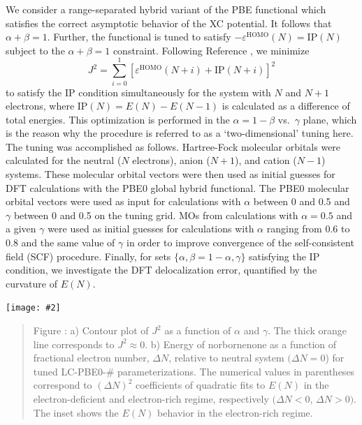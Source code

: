 \documentclass[landscape,a0b,final]{a0poster}
\newenvironment{poster}{
  \begin{center}
  \begin{minipage}[c]{0.98\textwidth}
}{
  \end{minipage} 
  \end{center}
}
\newcommand{\myfig}[3][0]{
\begin{center}
  \vspace{1.5cm}
  \texttt{[image: \#2]}
  \nobreak\medskip
\end{center}}
\newcommand{\mycaption}[1]{
  \vspace{0.5cm}
  \begin{quote}
    {{\sc Figure} \arabic{figure}: #1}
  \end{quote}
  \vspace{1cm}
  \stepcounter{figure}
}
\begin{document}
\begin{poster}
\begin{multicols}{3}
    We consider a range-separated hybrid variant of the PBE functional
    which satisfies the correct asymptotic behavior of the XC
    potential. It follows that $\alpha + \beta = 1$. Further, the
    functional is tuned to satisfy
    $-{\varepsilon}^{\text{HOMO}}(N)=\text{IP}(N)$ subject to the $\alpha
    + \beta = 1$ constraint. Following Reference
    , we minimize
    \begin{equation}
    J^2 =
    \sum_{i=0}^{1} [\varepsilon^{\text{HOMO}}(N+i)+\text{IP}(N+i)]^2 
    \label{eq:J2-criterion}
    \end{equation}
    to satisfy the IP condition simultaneously for the system with $N$ and
    $N+1$ electrons, where $\text{IP}(N)= E(N)-E(N-1)$ is calculated as a
    difference of total energies. This optimization is performed in the
    $\alpha = 1-\beta$ vs.\ $\gamma$ plane, which is the reason why the
    procedure is referred to as a `two-dimensional' tuning here. The
    tuning was accomplished as follows. Hartree-Fock molecular orbitals
    were calculated for the neutral ($N$ electrons), anion ($N+1$), and
    cation ($N-1$) systems. These molecular orbital vectors were then used
    as initial guesses for DFT calculations with the PBE0 global hybrid
    functional. The PBE0 molecular orbital vectors were used as input for
    calculations with $\alpha$ between 0 and 0.5 and $\gamma$ between 0
    and 0.5 on the tuning grid. MOs from calculations with $\alpha = 0.5$
    and a given $\gamma$ were used as initial guesses for calculations
    with $\alpha$ ranging from 0.6 to 0.8 and the same value of $\gamma$
    in order to improve convergence of the self-consistent field (SCF)
    procedure.  Finally, for sets $\{\alpha,\beta = 1-\alpha,\gamma\}$
    satisfying the IP condition, we investigate the DFT delocalization
    error, quantified by the curvature of $E(N)$.
    \begin{center}
    \myfig[0]{figures/norbornenone-tuning-correct}{1.0}
    \mycaption{a) Contour plot of $J^2$ as a function of
    $\alpha$ and $\gamma$. The thick orange line corresponds to $J^2
    \approx 0$. b) Energy of norbornenone as a function
    of fractional electron number, ${\Delta}N$, relative to neutral
    system $({\Delta}N = 0$) for tuned LC-PBE0-\# parameterizations. The
    numerical values in parentheses correspond to $({\Delta}N)^2$
    coefficients of quadratic fits to $E(N)$ in the electron-deficient
    and electron-rich regime, respectively $({\Delta}N < 0$, ${\Delta}N
    > 0)$. The inset shows the $E(N)$ behavior in the electron-rich
    regime.}
    \end{center}


\end{multicols}
\end{poster}
\end{document}
